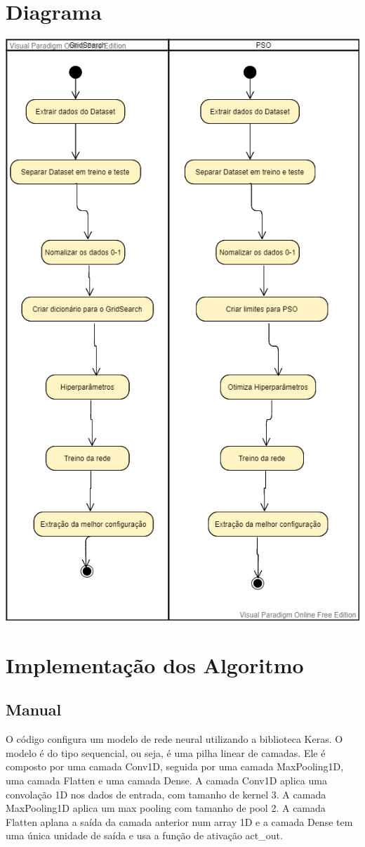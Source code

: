 \documentclass[10pt]{article}
\begin{document}
\section{Diagrama}
\includegraphics[width=\textwidth,height=\textheight,keepaspectratio]{img/Diagrama.png}

\section{Implementação dos Algoritmo}\label{sec:imp-al}
\subsection{Manual}
O código configura um modelo de rede neural utilizando a biblioteca Keras. 
O modelo é do tipo sequencial, ou seja, é uma pilha linear de camadas. Ele é 
composto por uma camada Conv1D, seguida por uma camada MaxPooling1D, 
uma camada Flatten e uma camada Dense. A camada Conv1D aplica uma convolação 
1D nos dados de entrada, com tamanho de kernel 3. A camada MaxPooling1D 
aplica um max pooling com tamanho de pool 2. A camada Flatten aplana a saída 
da camada anterior num array 1D e a camada Dense tem uma única unidade de saída 
e usa a função de ativação act\_out.
\end{document}
